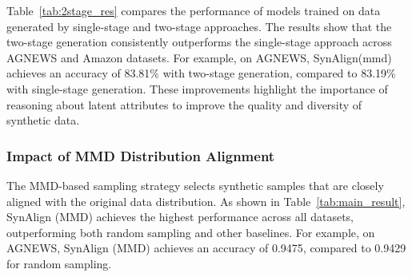 Table~\ref{tab:2stage_res} compares the performance of models trained on data generated by single-stage and two-stage approaches. The results show that the two-stage generation consistently outperforms the single-stage approach across AGNEWS and Amazon datasets. For example, on AGNEWS, SynAlign(mmd) achieves an accuracy of 83.81\% with two-stage generation, compared to 83.19\% with single-stage generation. These improvements highlight the importance of reasoning about latent attributes to improve the quality and diversity of synthetic data.

\begin{table}[!t]
\centering
\caption{Performance comparison between single-stage and two-stage generation on AGNEWS and Amazon datasets.}
\label{tab:2stage_res}
\end{table}

\subsubsection{Impact of MMD Distribution Alignment}

The MMD-based sampling strategy selects synthetic samples that are closely aligned with the original data distribution. As shown in Table~\ref{tab:main_result}, SynAlign (MMD) achieves the highest performance across all datasets, outperforming both random sampling and other baselines. For example, on AGNEWS, SynAlign (MMD) achieves an accuracy of 0.9475, compared to 0.9429 for random sampling.

